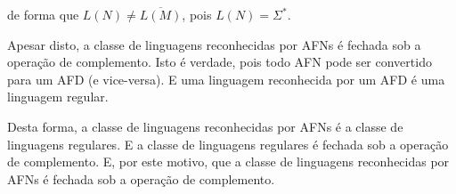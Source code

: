 \documentclass[12pt,a4paper,oneside]{article}
\begin{document}
\begin{enumerate}
{		
		de forma que $L(N) \not= \overline{L(M)}$, pois $L(N) = \Sigma^*$.
		
		Apesar disto, a classe de linguagens reconhecidas por AFNs é fechada sob a operação de complemento. Isto é verdade, pois todo AFN pode ser convertido para um AFD (e vice-versa). E uma linguagem reconhecida por um AFD é uma linguagem regular. 
		
		Desta forma, a classe de linguagens reconhecidas por AFNs é a classe de linguagens regulares. E a classe de linguagens regulares é fechada sob a operação de complemento. E, por este motivo, que a classe de linguagens reconhecidas por AFNs é fechada sob a operação de complemento.
	}

\end{enumerate}
\end{document}
